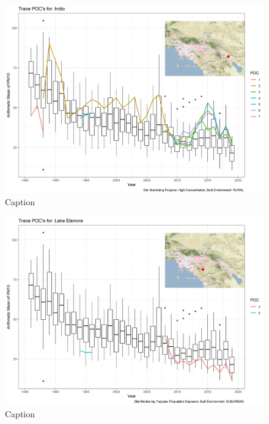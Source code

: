 \begin{figure}
    \centering
    \includegraphics[width = \textwidth]{Figures/IndividualSiteTraces/TracePOC_Indio.png}
    \caption{Caption}
    \label{fig:my_label}
\end{figure}

\begin{figure}
    \centering
    \includegraphics[width = \textwidth]{Figures/IndividualSiteTraces/TracePOC_Lake Elsinore.png}
    \caption{Caption}
    \label{fig:my_label}
\end{figure}

